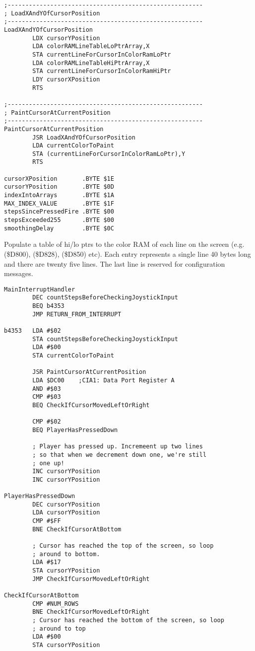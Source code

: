 \clearpage
\begin{lstlisting}
;-------------------------------------------------------
; LoadXAndYOfCursorPosition
;-------------------------------------------------------
LoadXAndYOfCursorPosition   
        LDX cursorYPosition
        LDA colorRAMLineTableLoPtrArray,X
        STA currentLineForCursorInColorRamLoPtr
        LDA colorRAMLineTableHiPtrArray,X
        STA currentLineForCursorInColorRamHiPtr
        LDY cursorXPosition
        RTS 

;-------------------------------------------------------
; PaintCursorAtCurrentPosition
;-------------------------------------------------------
PaintCursorAtCurrentPosition   
        JSR LoadXAndYOfCursorPosition
        LDA currentColorToPaint
        STA (currentLineForCursorInColorRamLoPtr),Y
        RTS 

cursorXPosition       .BYTE $1E
cursorYPosition       .BYTE $0D
indexIntoArrays       .BYTE $1A
MAX_INDEX_VALUE       .BYTE $1F
stepsSincePressedFire .BYTE $00
stepsExceeded255      .BYTE $00
smoothingDelay        .BYTE $0C

\end{lstlisting}
\clearpage

Populate a table of hi/lo ptrs to the color RAM
of each line on the screen (e.g. \icode(\$D800), \icode(\$D828), \icode(\$D850) etc). Each entry represents a single
line 40 bytes long and there are twenty five lines.
The last line is reserved for configuration messages.




\clearpage
\begin{lstlisting}
MainInterruptHandler   
        DEC countStepsBeforeCheckingJoystickInput
        BEQ b4353
        JMP RETURN_FROM_INTERRUPT

b4353   LDA #$02
        STA countStepsBeforeCheckingJoystickInput
        LDA #$00
        STA currentColorToPaint

        JSR PaintCursorAtCurrentPosition
        LDA $DC00    ;CIA1: Data Port Register A
        AND #$03
        CMP #$03
        BEQ CheckIfCursorMovedLeftOrRight

        CMP #$02
        BEQ PlayerHasPressedDown

        ; Player has pressed up. Incremeent up two lines
        ; so that when we decrement down one, we're still
        ; one up!
        INC cursorYPosition
        INC cursorYPosition

PlayerHasPressedDown   
        DEC cursorYPosition
        LDA cursorYPosition
        CMP #$FF
        BNE CheckIfCursorAtBottom

        ; Cursor has reached the top of the screen, so loop
        ; around to bottom.
        LDA #$17
        STA cursorYPosition
        JMP CheckIfCursorMovedLeftOrRight

CheckIfCursorAtBottom   
        CMP #NUM_ROWS
        BNE CheckIfCursorMovedLeftOrRight
        ; Cursor has reached the bottom of the screen, so loop
        ; around to top
        LDA #$00
        STA cursorYPosition

\end{lstlisting}
\clearpage

